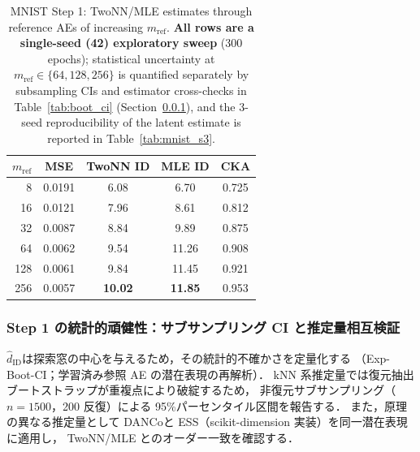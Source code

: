 \documentclass[11pt,a4paper]{jsarticle}
\newcommand{\hatdID}{\hat{d}_{\mathrm{ID}}}
\begin{document}
\begin{table}[H]
\centering
\caption{MNIST Step 1: TwoNN/MLE estimates through reference AEs of
increasing $m_{\mathrm{ref}}$. \textbf{All rows are a single-seed (42)
exploratory sweep} (300 epochs); statistical uncertainty at
$m_{\mathrm{ref}} \in \{64, 128, 256\}$ is quantified separately by
subsampling CIs and estimator cross-checks in
Table~\ref{tab:boot_ci} (Section~\ref{sec:exp_mnist_ci}), and the 3-seed
reproducibility of the latent estimate is reported in
Table~\ref{tab:mnist_s3}.}
\label{tab:mnist_s1}
\small
\begin{tabular}{rcccc}
\toprule
$m_{\mathrm{ref}}$ & MSE & TwoNN ID & MLE ID & CKA \\
\midrule
8   & 0.0191 & 6.08 & 6.70 & 0.725 \\
16  & 0.0121 & 7.96 & 8.61 & 0.812 \\
32  & 0.0087 & 8.84 & 9.89 & 0.875 \\
64  & 0.0062 & 9.54 & 11.26 & 0.908 \\
128 & 0.0061 & 9.84 & 11.45 & 0.921 \\
256 & 0.0057 & \textbf{10.02} & \textbf{11.85} & 0.953 \\
\bottomrule
\end{tabular}
\end{table}

\subsubsection{Step 1 の統計的頑健性：サブサンプリング CI と推定量相互検証}
\label{sec:exp_mnist_ci}

$\hatdID$は探索窓の中心を与えるため，その統計的不確かさを定量化する
（Exp-Boot-CI；学習済み参照 AE の潜在表現の再解析）．
kNN 系推定量では復元抽出ブートストラップが重複点により破綻するため，
非復元サブサンプリング（$n = 1500$，200 反復）による
95\%パーセンタイル区間を報告する．
また，原理の異なる推定量として DANCo\cite{ceruti2014danco}と
ESS\cite{johnsson2015ess}（scikit-dimension 実装）を同一潜在表現に適用し，
TwoNN/MLE とのオーダー一致を確認する．
\end{document}
